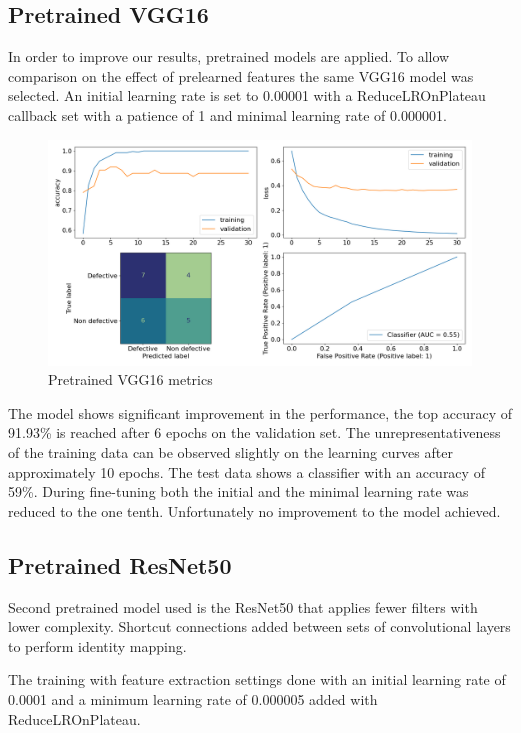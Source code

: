 \documentclass[10pt, final]{article}
\begin{document}
\subsection{Pretrained VGG16}
In order to improve our results, pretrained models are applied.
To allow comparison on the effect of prelearned features the same VGG16 model was selected.
An initial learning rate  is set to 0.00001 with a ReduceLROnPlateau callback set with a patience of 1 and minimal
learning rate of 0.000001.

\begin{figure}[!ht]
	\centering
	\includegraphics[width=\textwidth]{./tex_graphs/metrics_VGG16_pretrained.png}
	\caption{Pretrained VGG16 metrics}
	\label{fig:VGG16_pretrained_metrics}
\end{figure}

The model shows significant improvement in the performance, the top accuracy of 91.93\% is reached after 6 epochs
on the validation set.
The unrepresentativeness of the training data can be observed slightly on the learning curves after approximately
10 epochs.
The test data shows a classifier with an accuracy of 59\%.
During fine-tuning both the initial and the minimal learning rate was reduced to the one tenth.
Unfortunately no improvement to the model achieved.

\subsection{Pretrained ResNet50}
Second pretrained model used is the ResNet50 that applies fewer filters with lower complexity.
Shortcut connections added between sets of convolutional layers to perform identity mapping.

The training with feature extraction settings done with an initial learning rate of 0.0001 and a minimum learning
rate of 0.000005 added with ReduceLROnPlateau.
\end{document}

